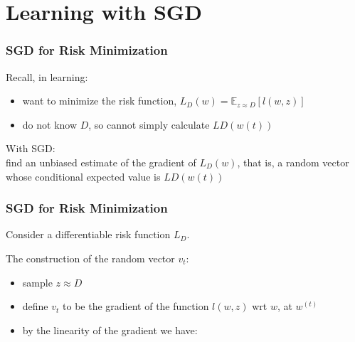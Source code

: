 \section{Learning with SGD}

\begin{frame}
\frametitle{SGD for Risk Minimization}

Recall, in learning:\\
\begin{itemize}
\item want to minimize the risk function, $L_D(w) = \mathbb{E}_{z \approx D} [l(w, z)]$
\item do not know $D$, so cannot simply calculate $LD (w(t))$
\end{itemize}

With SGD:\\
find an unbiased estimate of the gradient of $L_D(w)$, that is,
a random vector whose conditional expected value is $LD (w(t) )$

\end{frame}


\begin{frame}
\frametitle{SGD for Risk Minimization}

Consider a differentiable risk function $L_D$.

The construction of the random vector $v_t$:
\begin{itemize}
\item sample $z \approx D$
\item define $v_t$ to be the gradient of the function $l(w, z)$ wrt $w$, at $w^{(t)}$
\item by the linearity of the gradient we have:
\end{itemize}



\end{frame}

